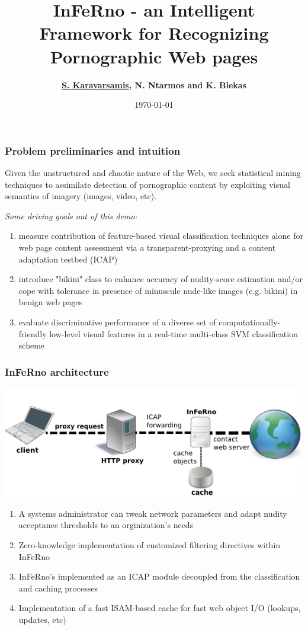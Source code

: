\documentclass{beamer}
\title[ECML/PKDD 2011 demo session (demo \#10)]{InFeRno - an Intelligent Framework for Recognizing Pornographic Web pages}
\author{\bf{\underline{S. Karavarsamis}, N. Ntarmos and K. Blekas }}
\institute[UoI]
{
Department of Computer Science\\
University of Ioannina, Greeece \\
\medskip
{\{cs061205, ntarmos, kblekas\}@cs.uoi.gr}
}
\date{\today}
\begin{document}
\begin{frame}
\titlepage
\end{frame}
\begin{frame}
\frametitle{Problem preliminaries and intuition}
\begin{block}
{}
Given the unstructured and chaotic nature of the Web, we seek statistical mining techniques to assimilate detection of pornographic content by exploiting visual semantics of imagery (images, video, etc).
\end{block}
\emph{Some driving goals out of this demo:}
\begin{enumerate}
\item measure contribution of feature-based visual classification techniques alone for web page content assessment via a transparent-proxying and a content adaptation testbed (ICAP)
\item introduce "bikini" class to enhance accuracy of nudity-score estimation and/or cope with tolerance in presence of minuscule nude-like images (e.g. bikini) in benign web pages
\item evaluate discriminative performance of a diverse set of computationally-friendly low-level visual features in a real-time multi-class SVM classification scheme
\end{enumerate}
\end{frame}

\begin{frame}
\frametitle{InFeRno architecture}
\begin{center}
\includegraphics[scale=0.6]{images/network_diagram.png}
\begin{enumerate}
\item A systems administrator can tweak network parameters and adapt nudity acceptance thresholds to an orginization's needs
\item Zero-knowledge implementation of customized filtering directives within InFeRno
\item InFeRno's implemented as an ICAP module decoupled from the classification and caching processes
\item Implementation of a fast ISAM-based cache for fast web object I/O (lookups, updates, etc)
\end{enumerate}
\end{center}
\end{frame}
\end{document}
